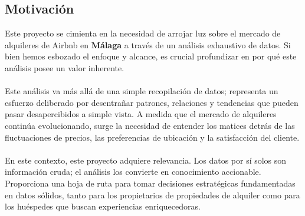 \subsection{Motivación}
Este proyecto se cimienta en la necesidad de arrojar luz sobre el mercado de alquileres de Airbnb en \textbf{Málaga} a través de un análisis exhaustivo de datos. Si bien hemos esbozado el enfoque y alcance, es crucial profundizar en por qué este análisis posee un valor inherente.\\\\
Este análisis va más allá de una simple recopilación de datos; representa un esfuerzo deliberado por desentrañar patrones, relaciones y tendencias que pueden pasar desapercibidos a simple vista. A medida que el mercado de alquileres continúa evolucionando, surge la necesidad de entender los matices detrás de las fluctuaciones de precios, las preferencias de ubicación y la satisfacción del cliente.\\\\
En este contexto, este proyecto adquiere relevancia. Los datos por sí solos son información cruda; el análisis los convierte en conocimiento accionable. Proporciona una hoja de ruta para tomar decisiones estratégicas fundamentadas en datos sólidos, tanto para los propietarios de propiedades de alquiler como para los huéspedes que buscan experiencias enriquecedoras.

\newpage